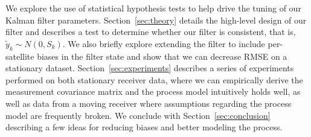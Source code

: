 We explore the use of statistical hypothesis tests to help drive the tuning of our Kalman filter parameters.  Section~\ref{sec:theory} details the high-level design of our filter and describes a test to determine whether our filter is consistent, that is, $\tilde{y}_k \sim N(0,S_k)$.  We also briefly explore extending the filter to include per-satellite biases in the filter state and show that we can decrease RMSE on a stationary dataset.  Section~\ref{sec:experiments} describes a series of experiments performed on both stationary receiver data, where we can empirically derive the measurement covariance matrix and the process model intuitively holds well, as well as data from a moving receiver where assumptions regarding the process model are frequently broken.  We conclude with Section~\ref{sec:conclusion} describing a few ideas for reducing biases and better modeling the process.
